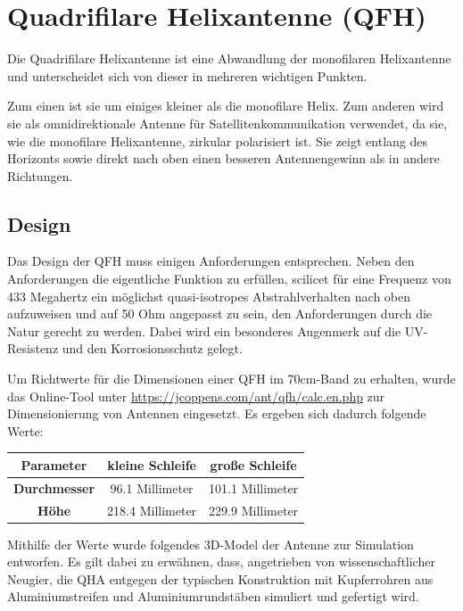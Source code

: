 \chapter{Quadrifilare Helixantenne (QFH)}
\label{chap:qfh}
Die Quadrifilare Helixantenne ist eine Abwandlung der monofilaren Helixantenne und unterscheidet sich von dieser in mehreren wichtigen Punkten.

Zum einen ist sie um einiges kleiner als die monofilare Helix. Zum anderen wird sie als omnidirektionale Antenne für Satellitenkommunikation verwendet, da sie, wie die monofilare Helixantenne, zirkular polarisiert ist. Sie zeigt entlang des Horizonts sowie direkt nach oben einen besseren Antennengewinn als in andere Richtungen.

\section{Design}
Das Design der QFH muss einigen Anforderungen entsprechen. Neben den Anforderungen die eigentliche Funktion zu erfüllen, scilicet für eine Frequenz von 433 Megahertz ein möglichst quasi-isotropes Abstrahlverhalten nach oben aufzuweisen und auf 50 Ohm angepasst zu sein, den Anforderungen durch die Natur gerecht zu werden. Dabei wird ein besonderes Augenmerk auf die UV-Resistenz und den Korrosionsschutz gelegt. 

Um Richtwerte für die Dimensionen einer QFH im 70cm-Band zu erhalten, wurde das Online-Tool unter \url{https://jcoppens.com/ant/qfh/calc.en.php} zur Dimensionierung von Antennen eingesetzt. Es ergeben sich dadurch folgende Werte:

\begin{center}
	\begin{tabular}{|c|c|c|}
		\hline
		\textbf{Parameter} & \textbf{kleine Schleife} & \textbf{große Schleife} \\
		\hline
		\textbf{Durchmesser} & 96.1 Millimeter & 101.1 Millimeter \\
		\hline
		\textbf{Höhe} & 218.4 Millimeter & 229.9 Millimeter \\
		\hline
	\end{tabular}
\end{center}

Mithilfe der Werte wurde folgendes 3D-Model der Antenne zur Simulation entworfen. Es gilt dabei zu erwähnen, dass, angetrieben von wissenschaftlicher Neugier, die QHA entgegen der typischen Konstruktion mit Kupferrohren aus Aluminiumstreifen und Aluminiumrundstäben simuliert und gefertigt wird. 


